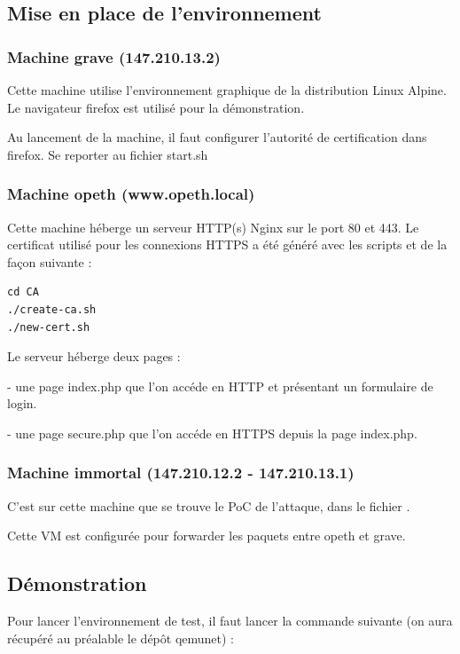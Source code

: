 \subsection{Mise en place de l'environnement}

\subsubsection{Machine grave (147.210.13.2)}

Cette machine utilise l'environnement graphique de la distribution Linux Alpine. Le navigateur firefox est utilisé pour la démonstration.

Au lancement de la machine, il faut configurer l'autorité de certification dans firefox. Se reporter au fichier start.sh

\subsubsection{Machine opeth (www.opeth.local)}

Cette machine héberge un serveur HTTP(s) Nginx sur le port 80 et 443. Le certificat utilisé pour les connexions HTTPS a été généré avec les scripts  et  de la façon suivante :

\begin{verbatim}
cd CA
./create-ca.sh
./new-cert.sh
\end{verbatim}

Le serveur héberge deux pages :

  - une page index.php que l'on accéde en HTTP et présentant un formulaire de login.

  - une page secure.php que l'on accéde en HTTPS depuis la page index.php.

\subsubsection{Machine immortal (147.210.12.2 - 147.210.13.1)}

C'est sur cette machine que se trouve le PoC de l'attaque, dans le fichier .

Cette VM est configurée pour forwarder les paquets entre opeth et grave.

\subsection{Démonstration}

Pour lancer l'environnement de test, il faut lancer la commande suivante (on aura récupéré au préalable le dépôt qemunet) :

